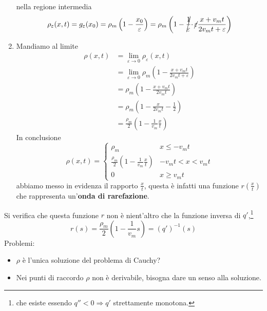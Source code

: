 \documentclass[10pt,a4paper,twoside,openright]{book}
\begin{document}
\begin{enumerate}
	      
	      nella regione intermedia
	      \begin{equation*}
	      	\rho _{\varepsilon }( x,t) =g_{\varepsilon }( x_{0}) =\rho _{m}\left( 1-\frac{x_{0}}{\varepsilon }\right) =\rho _{m}\left( 1-\cancel{\frac{1}{\varepsilon }} \cdotp \cancel{\varepsilon }\frac{x+v_{m} t}{2v_{m} t+\varepsilon }\right)
	      \end{equation*}
	\item Mandiamo al limite
	      \begin{align*}
	      	\rho ( x,t) & =\lim _{\varepsilon \rightarrow 0} \rho _{\varepsilon }( x,t)                                       \\
	      	            & =\lim _{\varepsilon \rightarrow 0} \rho _{m}\left( 1-\frac{x+v_{m} t}{2v_{m} t+\varepsilon }\right) \\
	      	            & =\rho _{m}\left( 1-\frac{x+v_{m} t}{2v_{m} t}\right)                                                \\
	      	            & =\rho _{m}\left( 1-\frac{x}{2v_{m} t} -\frac{1}{2}\right)                                           \\
	      	            & =\frac{\rho _{m}}{2}\left( 1-\frac{1}{v_{m}}\frac{x}{t}\right)                                      
	      \end{align*}
	      In conclusione
	      \begin{equation*}
	      	\rho (x,t) = \begin{cases}
	      		\rho _{m} & x\le -v_{m}t\\
	      		\frac{\rho _{m}}{2}\left( 1-\frac{1}{v_{m}}\frac{x}{t} \right) & -v_{m}t < x < v_{m}t\\
	      		0 & x\geq v_{m}t 
	      	\end{cases}
	      \end{equation*}
	      abbiamo messo in evidenza il rapporto $\frac{x}{t}$, questa è infatti una funzione $r\left(\frac{x}{t}\right)$ che rappresenta un'\textbf{onda di rarefazione}.
\end{enumerate}


Si verifica che questa funzione $r$ non è nient'altro che la funzione inversa di $q'$,\footnote{che esiste essendo $q''< 0\Rightarrow q'$ strettamente monotona.}
\begin{equation*}
	r( s) =\frac{\rho _{m}}{2}\left( 1-\frac{1}{v_{m}} s\right) =( q')^{-1}( s)
\end{equation*}
Problemi:
\begin{itemize}
	\item $\rho $ è l'unica soluzione del problema di Cauchy?
	\item Nei punti di raccordo $\rho $ non è derivabile, bisogna dare un senso alla soluzione.
\end{itemize}
\end{document}
